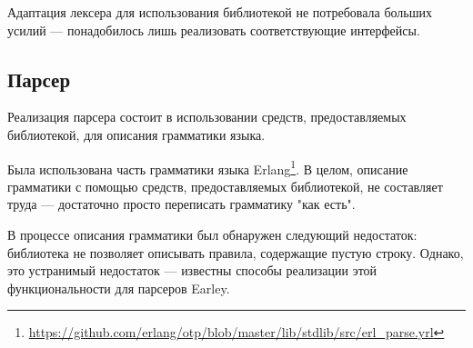 Адаптация лексера для использования библиотекой не потребовала больших усилий --- понадобилось лишь реализовать соответствующие интерфейсы.

\subsection{Парсер}

Реализация парсера состоит в использовании средств, предоставляемых библиотекой, для описания грамматики языка.

Была использована часть грамматики языка Erlang\footnote{\url{https://github.com/erlang/otp/blob/master/lib/stdlib/src/erl\_parse.yrl}}. В целом, описание грамматики с помощью средств, предоставляемых библиотекой, не составляет труда --- достаточно просто переписать грамматику "как есть".

В процессе описания грамматики был обнаружен следующий недостаток: библиотека не позволяет описывать правила, содержащие пустую строку. Однако, это устранимый недостаток --- известны способы реализации этой функциональности для парсеров Earley\cite{emptyrules}.

